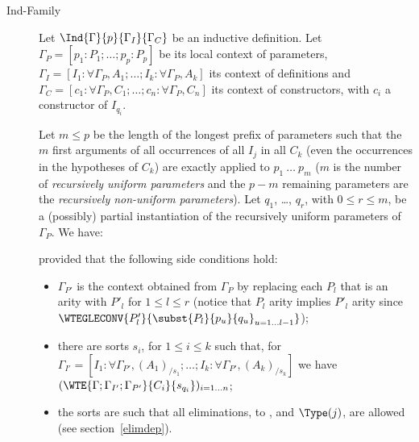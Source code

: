 \begin{description}
\item[Ind-Family] Let $\Ind{\Gamma}{p}{\Gamma_I}{\Gamma_C}$ be an
  inductive definition. Let $\Gamma_P = [p_1:P_1;\ldots;p_{p}:P_{p}]$
  be its local context of parameters, $\Gamma_I = [I_1:\forall
    \Gamma_P,A_1;\ldots;I_k:\forall \Gamma_P,A_k]$ its context of
  definitions and $\Gamma_C = [c_1:\forall
    \Gamma_P,C_1;\ldots;c_n:\forall \Gamma_P,C_n]$ its context of
  constructors, with $c_i$ a constructor of $I_{q_i}$.

  Let $m \leq p$ be the length of the longest prefix of parameters
  such that the $m$ first arguments of all occurrences of all $I_j$ in
  all $C_k$ (even the occurrences in the hypotheses of $C_k$) are
  exactly applied to $p_1~\ldots~p_m$ ($m$ is the number of {\em
    recursively uniform parameters} and the $p-m$ remaining parameters
  are the {\em recursively non-uniform parameters}). Let $q_1$,
  \ldots, $q_r$, with $0\leq r\leq m$, be a (possibly) partial
  instantiation of the recursively uniform parameters of
  $\Gamma_P$. We have:


provided that the following side conditions hold:

\begin{itemize}
\item $\Gamma_{P'}$ is the context obtained from $\Gamma_P$ by
replacing each $P_l$ that is an arity with $P'_l$ for $1\leq l \leq r$ (notice that
$P_l$ arity implies $P'_l$ arity since $\WTEGLECONV{P'_l}{ \subst{P_l}{p_u}{q_u}_{u=1\ldots l-1}}$);
\item there are sorts $s_i$, for $1 \leq i \leq k$ such that, for
 $\Gamma_{I'} = [I_1:\forall
    \Gamma_{P'},(A_1)_{/s_1};\ldots;I_k:\forall \Gamma_{P'},(A_k)_{/s_k}]$
we have $(\WTE{\Gamma;\Gamma_{I'};\Gamma_{P'}}{C_i}{s_{q_i}})_{i=1\ldots  n}$;
\item the sorts are such that all eliminations, to {\Prop}, {\Set} and
  $\Type(j)$, are allowed (see section~\ref{elimdep}).
\end{itemize}
\end{description}

